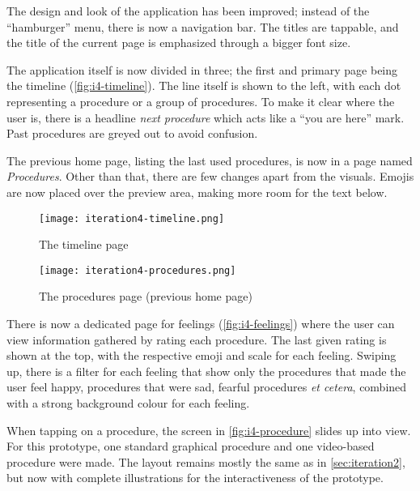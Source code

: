The design and look of the application has been improved; instead of the \enquote{hamburger} menu, there is now a navigation bar. The titles are tappable, and the title of the current page is emphasized through a bigger font size.

The application itself is now divided in three; the first and primary page being the timeline (\autoref{fig:i4-timeline}). The line itself is shown to the left, with each dot representing a procedure or a group of procedures. To make it clear where the user is, there is a headline \emph{next procedure} which acts like a \enquote{you are here} mark. Past procedures are greyed out to avoid confusion.

The previous home page, listing the last used procedures, is now in a page named \emph{Procedures}. Other than that, there are few changes apart from the visuals. Emojis are now placed over the preview area, making more room for the text below.

\begin{sidewaysfigure}
    \centering
    \hspace{\fill}
    \begin{minipage}{0.4\textwidth}
        \centering
        \texttt{[image: iteration4-timeline.png]}
        \caption{The timeline page}
        \label{fig:i4-timeline}
    \end{minipage}
    \hspace{\fill}
    \begin{minipage}{0.4\textwidth}
        \centering
        \texttt{[image: iteration4-procedures.png]}
        \caption{The procedures page (previous home page)}
        \label{fig:i4-procedures}
    \end{minipage}
    \hspace*{\fill}
\end{sidewaysfigure}

There is now a dedicated page for feelings (\autoref{fig:i4-feelings}) where the user can view information gathered by rating each procedure. The last given rating is shown at the top, with the respective emoji and scale for each feeling. Swiping up, there is a filter for each feeling that show only the procedures that made the user feel happy, procedures that were sad, fearful procedures \emph{et cetera}, combined with a strong background colour for each feeling.

When tapping on a procedure, the screen in \autoref{fig:i4-procedure} slides up into view. For this prototype, one standard graphical procedure and one video-based procedure were made. The layout remains mostly the same as in \autoref{sec:iteration2}, but now with complete illustrations for the interactiveness of the prototype.

